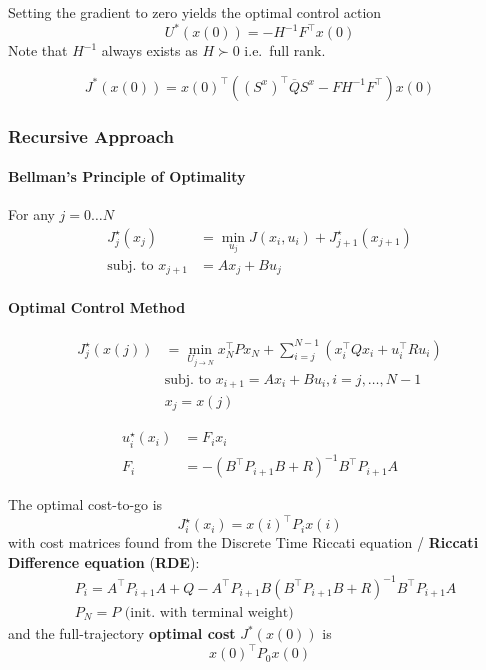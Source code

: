\newpar{}

Setting the gradient to zero yields the optimal control action
\begin{equation*}
    U^*(x(0)) = -H^{-1}F^\top x(0)
\end{equation*}
Note that $H^{-1}$ always exists as $H\succ 0$ i.e.\ full rank.

\begin{equation*}
    J^*(x(0)) = {x(0)}^{\top}\left({(S^{x})}^{\top}\overline{Q}S^{x}- F H^{-1} F^\top\right)x(0)
\end{equation*}

\subsubsection{Recursive Approach}
\paragraph{Bellman's Principle of Optimality}
For any $j=0\dots N$
\begin{align*}
    J_{j}^{\star}(x_{j})     & =\min_{u_{j}}J(x_{i},u_{i})+J_{j+1}^{\star}(x_{j+1}) \\
    \text{subj.\ to }x_{j+1} & =Ax_{j}+Bu_{j}
\end{align*}

\paragraph{Optimal Control Method}

\begin{align*}
    J_j^\star(x(j)) & =\min_{U_{j\to N}}x_N^\top Px_N+\sum_{i=j}^{N-1}(x_i^\top Qx_i+u_i^\top Ru_i) \\
                    & \text{subj.\ to }x_{i+1}=Ax_i+Bu_i,i=j,\dots,N-1                              \\
                    & x_j=x(j)
\end{align*}

\newpar{}
\noindent
\begin{align*}
    u_{i}^{\star}(x_i) & =F_{i} x_{i}                                  \\
    F_{i}              & =-{(B^\top P_{i+1} B+R)}^{-1}B^\top P_{i+1} A
\end{align*}

The optimal cost-to-go is
\begin{equation*}
    J_{i}^{\star}(x_{i})  = {x(i)}^{\top}P_{i}x(i)
\end{equation*}
with cost matrices found from the Discrete Time Riccati equation / \textbf{Riccati Difference equation} (\textbf{RDE}):
\begin{align*}
     & P_{i} = A^\top P_{i+1} A+Q-A^\top P_{i+1} B{(B^\top P_{i+1} B+R)}^{-1}B^\top P_{i+1} A \\
     & P_{N} = P \text{ (init.\ with terminal weight)}
\end{align*}
and the full-trajectory \textbf{optimal cost} $J^*(x(0))$ is
\begin{equation*}
    {x(0)}^\top P_0 x(0)
\end{equation*}

